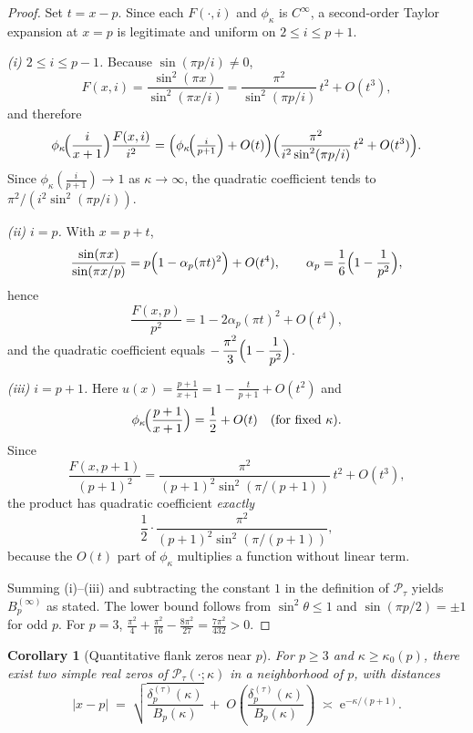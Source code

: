 \documentclass[11pt,a4paper]{amsart}
\theoremstyle{plain}
\newtheorem{corollary}[theorem]{Corollary}
\theoremstyle{definition}
\theoremstyle{remark}
\begin{document}
\begin{proof}
Set $t=x-p$. Since each $F(\cdot,i)$ and $\phi_\kappa$ is $C^\infty$, a second-order Taylor expansion at $x=p$ is legitimate and uniform on $2\le i\le p+1$.

\emph{(i) $2\le i\le p-1$.} Because $\sin(\pi p/i)\neq 0$,
\[
F(x,i)=\frac{\sin^2(\pi x)}{\sin^2(\pi x/i)}=\frac{\pi^2}{\sin^2(\pi p/i)}\,t^2+O(t^3),
\]
and therefore
\[
\phi_\kappa\!\Bigl(\frac{i}{x+1}\Bigr)\frac{F(x,i)}{i^2}
=\Bigl(\phi_\kappa\!\Bigl(\tfrac{i}{p+1}\Bigr)+O(t)\Bigr)\Bigl(\frac{\pi^2}{i^2\sin^2(\pi p/i)}\,t^2+O(t^3)\Bigr).
\]
Since $\phi_\kappa(\tfrac{i}{p+1})\to 1$ as $\kappa\to\infty$, the quadratic coefficient tends to $\pi^2/(i^2\sin^2(\pi p/i))$.

\emph{(ii) $i=p$.} With $x=p+t$,
\[
\frac{\sin(\pi x)}{\sin(\pi x/p)}=p\Bigl(1-\alpha_p(\pi t)^2\Bigr)+O(t^4),\qquad
\alpha_p=\frac{1}{6}\Bigl(1-\frac{1}{p^2}\Bigr),
\]
hence
\[
\frac{F(x,p)}{p^2}=1-2\alpha_p(\pi t)^2+O(t^4),
\]
and the quadratic coefficient equals $-\,\dfrac{\pi^2}{3}\Bigl(1-\dfrac{1}{p^2}\Bigr)$.

\emph{(iii) $i=p+1$.} Here $u(x)=\tfrac{p+1}{x+1}=1-\tfrac{t}{p+1}+O(t^2)$ and
\[
\phi_\kappa\!\Bigl(\frac{p+1}{x+1}\Bigr)=\frac12+O(t) \quad (\text{for fixed }\kappa).
\]
Since
\[
\frac{F(x,p+1)}{(p+1)^2}=\frac{\pi^2}{(p+1)^2\sin^2(\pi/(p+1))}\,t^2+O(t^3),
\]
the product has quadratic coefficient \emph{exactly}
\[
\frac{1}{2}\cdot\frac{\pi^2}{(p+1)^2\sin^2(\pi/(p+1))},
\]
because the $O(t)$ part of $\phi_\kappa$ multiplies a function without linear term.

Summing (i)–(iii) and subtracting the constant $1$ in the definition of $\mathcal P_\tau$ yields $B_p^{(\infty)}$ as stated. The lower bound follows from $\sin^2\theta\le 1$ and $\sin(\pi p/2)=\pm 1$ for odd $p$. For $p=3$,
\(
\frac{\pi^2}{4}+\frac{\pi^2}{16}-\frac{8\pi^2}{27}=\frac{7\pi^2}{432}>0.
\)
\end{proof}


\begin{corollary}[Quantitative flank zeros near $p$]
For $p\ge3$ and $\kappa\ge \kappa_0(p)$, there exist two simple real zeros of $\mathcal P_\tau(\cdot;\kappa)$ in a neighborhood of $p$, with distances
\[
|x-p|\;=\;\sqrt{\frac{\delta_p^{(\tau)}(\kappa)}{B_p(\kappa)}}\;+\;O\!\left(\frac{\delta_p^{(\tau)}(\kappa)}{B_p(\kappa)}\right)
\;\asymp\; \mathrm e^{-\kappa/(p+1)}.
\]
\end{corollary}
\end{document}
